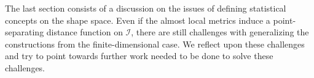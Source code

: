 The last section consists of a discussion on the issues of defining statistical concepts on the shape space. Even if the almost local metrics induce a point-separating distance function on $\mathcal{I}$, there are still challenges with generalizing the constructions from the finite-dimensional case. We reflect upon these challenges and try to point towards further work needed to be done to solve these challenges.








\newpage